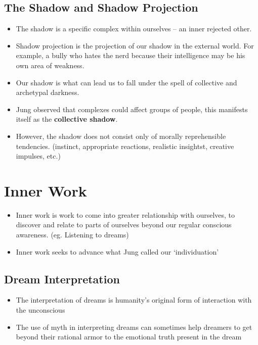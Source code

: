 \documentclass[twocolumn]{article}
\theoremstyle{plain}
\begin{document}
\subsection{The Shadow and Shadow Projection}

\begin{itemize}
    \item The shadow is a specific complex within ourselves -- an inner rejected other.
    \item Shadow projection is the projection of our shadow in the external world. For example, a bully who hates the nerd because their intelligence may be his own area of weakness.
    \item Our shadow is what can lead us to fall under the spell of collective and archetypal darkness.
    \item Jung observed that complexes could affect groups of people, this manifests itself as the \textbf{collective shadow}.
    \item However, the shadow does not consist only of morally reprehensible tendencies. (instinct, appropriate reactions, realistic insightst, creative impulses, etc.)
\end{itemize}

\section{Inner Work}

\begin{itemize}
    \item Inner work is work to come into greater relationship with ourselves, to discover and relate to parts of ourselves beyond our regular conscious awareness. (eg. Listening to dreams)
    \item Inner work seeks to advance what Jung called our `individuation'
\end{itemize}

\subsection{Dream Interpretation}

\begin{itemize}
    \item The interpretation of dreams is humanity's original form of interaction with the unconscious
    \item The use of myth in interpreting dreams can sometimes help dreamers to get beyond their rational armor to the emotional truth present in the dream
\end{itemize}
\end{document}
